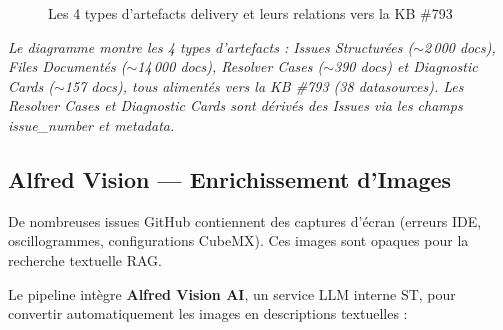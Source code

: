 \documentclass[12pt,a4paper]{report}
\begin{document}
\begin{figure}[H]
\centering
{}
\caption{Les 4 types d'artefacts delivery et leurs relations vers la KB \#793}
\label{fig:delivery_artifacts}
\end{figure}

\textit{Le diagramme montre les 4 types d'artefacts : Issues Structurées ($\sim$2\,000 docs), Files Documentés ($\sim$14\,000 docs), Resolver Cases ($\sim$390 docs) et Diagnostic Cards ($\sim$157 docs), tous alimentés vers la KB \#793 (38 datasources). Les Resolver Cases et Diagnostic Cards sont dérivés des Issues via les champs issue\_number et metadata.}

\subsection{Alfred Vision --- Enrichissement d'Images}

De nombreuses issues GitHub contiennent des captures d'écran (erreurs IDE, oscillogrammes, configurations CubeMX). Ces images sont opaques pour la recherche textuelle RAG.

Le pipeline intègre \textbf{Alfred Vision AI}, un service LLM interne ST, pour convertir automatiquement les images en descriptions textuelles :
\end{document}
